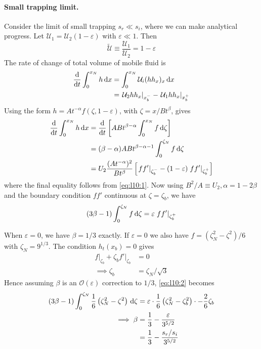 \documentclass{jknotes}
\newcommand{\veps}{\varepsilon}
\begin{document}
\paragraph{Small trapping limit.}
Consider the limit of small trapping $s_r \ll s_i$, where we can make
analytical progress. Let $\mathcal{U}_1 = \mathcal{U}_2(1-\veps)$ with $\veps \ll 1$. Then
\begin{equation}
	\tilde{\mathcal{U}} \equiv \frac{\mathcal{U}_1}{\mathcal{U}_2} = 1-\veps
\end{equation}
The rate of change of total volume of mobile fluid is
\begin{align}
	\frac{\diffd}{\diffd t} \int_0^{x_N} h \, \diffd x 
	&= \int_0^{x_N} \mathcal{U}_i (hh_x)_x \, \diffd x \\
	&= \left.\mathcal{U}_2 hh_x \right|_{x_b^-} - \left. \mathcal{U}_1 hh_x\right|_{x_b^+}
	\label{eq:l10:1}
\end{align}
Using the form $h = A t^{-\alpha}f(\zeta, 1-\veps)$, with $\zeta =
x/Bt^\beta$, gives
\begin{align}
	\frac{\diffd}{\diffd t} \int_0^{x_N} h \, \diffd x 
	&= \frac{\diffd}{\diffd t} \left[ AB t^{\beta-\alpha} \int_0^{x_N} f \,
	\diffd \zeta \right] \\
	&= (\beta - \alpha) AB t^{\beta-\alpha-1} \int_0^{\zeta_N} f \, \diffd
	\zeta \\
	&= U_2 \frac{(At^{-\alpha})^2}{Bt^\beta} \left[
	\left.ff'\right|_{\zeta_b^-} -
	(1-\veps)\left.ff'\right|_{\zeta_b^+}\right]
\end{align}
where the final equality follows from \eqref{eq:l10:1}. Now using $B^2/A
\equiv U_2, \alpha = 1-2\beta$ and the boundary condition $ff'$ continuous at
$\zeta=\zeta_b$, we have
\begin{equation}
	(3\beta -1)\int_0^{\zeta_N} f \, \diffd \zeta = \veps \left.
	ff'\right|_{\zeta_b^+} \label{eq:l10:2}
\end{equation}

When $\veps = 0$, we have $\beta = 1/3$ exactly. If $\veps =0 $ we also have
$f = (\zeta_N^2 - \zeta^2)/6$ with $\zeta_N = 9^{1/3}$. The condition
$h_t(x_b) = 0$ gives
\begin{align}
	\left.f\right|_{\zeta_b} + \zeta_b \left. f'\right|_{\zeta_b} &= 0 \\
	\implies \zeta_b &= \zeta_N/\sqrt{3}
\end{align}
Hence assuming $\beta$ is an $\mathcal{O}(\veps)$ correction to $1/3$,
\eqref{eq:l10:2} becomes
\begin{align}
(3\beta-1) \int_0^{\zeta_N} \frac{1}{6}\left(\zeta_N^2 - \zeta^2\right) \,
\diffd \zeta &= \veps \cdot \frac{1}{6}\left(\zeta_N^2 - \zeta_b^2\right)\cdot
-\frac{2}{6}\zeta_b \\
\implies \beta &= \frac{1}{3}-\frac{\veps}{3^{5/2}} \\
			   &= \frac{1}{3}-\frac{s_r/s_i}{3^{5/2}}
\end{align}
\end{document}
